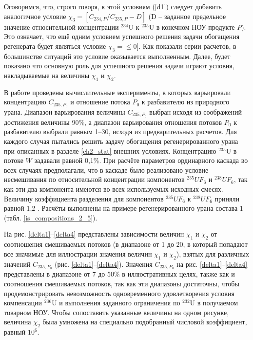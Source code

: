 Оговоримся, что, строго говоря, к этой условиям (\ref{d1}) следует добавить аналогичное условие $\chi_3=\left[C_{234,P}/C_{235,P}-D\right]$ (D -- заданное предельное значение относительной концентрации $^{234}$U к $^{235}$U в конечном НОУ-продукте $P$). Это означает, что ещё одним условием успешного решения задачи обогащения регенерата будет являться условие $\chi_3=\leq0]$. Как показали серии расчетов, в большинстве ситуаций это условие оказывается выполненным. Далее, будет показано что основную роль для успешного решения задачи играют условия, накладываемые на величины $\chi_1$ и $\chi_2$.

В работе проведены вычислительные эксперименты, в которых варьировали концентрацию $C_{235, P_0}$ и отношение потока $P_0$ к разбавителю из природного урана. Диапазон варьирования величины $C_{235, P_0}$ выбран исходя из соображений достижения величины 90\%, а диапазон варьирования отношения потоков $P_0$ к разбавителю выбрали равным 1--30, исходя из предварительных расчетов. Для каждого случая пытались решить задачу обогащения регенерированного урана при описанных в разделе \ref{ch2_stat} внешних условиях. Концентрацию $^{235}$U в потоке $W$ задавали равной 0,1\%. При расчёте параметров ординарного каскада во всех случаях предполагали, что в каскаде было реализовано условие несмешивания по относительной концентрации компонентов $^{235}UF_6$ и $^{238}UF_6$, так как эти два компонента имеются во всех используемых исходных смесях. Величину коэффициента разделения для компонентов  $^{235}UF_6$ к $^{238}UF_6$ приняли равной 1,2 \cite{smirnovEvolutionIsotopicComposition2012}. Расчёты выполнены на примере регенерированного урана состава 1 (табл. \ref{is_compositions_2_5}).

На рис. \ref{delta1}--\ref{delta4} представлены зависимости величин $\chi_1$ и $\chi_2$ от соотношения смешиваемых потоков (в диапазоне от 1 до 20, в который попадают все значимые для иллюстрации значения величин $\chi_1$ и $\chi_2$), взятых для различных значений $C_{235, P_0}$ (рис. \ref{delta1}--\ref{delta4}). Значения $C_{235, P_0}$ на рис. \ref{delta1}--\ref{delta4} представлены в диапазоне от 7 до 50\% в иллюстративных целях,  также как и соотношения смешиваемых потоков, так как эти диапазоны достаточны, чтобы продемонстрировать невозможность одновременного удовлетворения условия компенсации $^{236}$U и выполнения заданного ограничения по $^{232}$U в получаемом товарном НОУ. Чтобы сопоставить указанные величины на одном рисунке, величина $\chi_2$ была умножена на специально подобранный числовой коэффициент, равный $10^{6}$.

